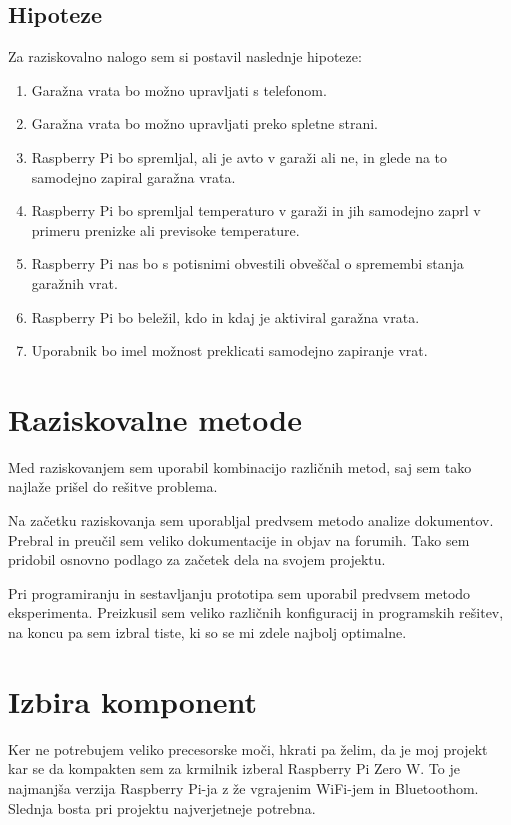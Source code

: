 \documentclass[11pt]{article}
\begin{document}
\subsection{Hipoteze}
Za raziskovalno nalogo sem si postavil naslednje hipoteze:
\begin{enumerate}
    \item Garažna vrata bo možno upravljati s telefonom.
    \item Garažna vrata bo možno upravljati preko spletne strani.
    \item Raspberry Pi bo spremljal, ali je avto v garaži ali ne, in glede na to samodejno zapiral garažna vrata.
    \item Raspberry Pi bo spremljal temperaturo v garaži in jih samodejno zaprl v primeru prenizke ali previsoke temperature.
    \item Raspberry Pi nas bo s potisnimi obvestili obveščal o spremembi stanja garažnih vrat.
    \item Raspberry Pi bo beležil, kdo in kdaj je aktiviral garažna vrata.
    \item Uporabnik bo imel možnost preklicati samodejno zapiranje vrat.
\end{enumerate}

\section{Raziskovalne metode}
Med raziskovanjem sem uporabil kombinacijo različnih metod, saj sem tako najlaže prišel do rešitve problema.

Na začetku raziskovanja sem uporabljal predvsem metodo analize dokumentov. Prebral in preučil sem veliko dokumentacije in objav na forumih. Tako sem pridobil osnovno podlago za začetek dela na svojem projektu.

Pri programiranju in sestavljanju prototipa sem uporabil predvsem metodo eksperimenta. Preizkusil sem veliko različnih konfiguracij in programskih rešitev, na koncu pa sem izbral tiste, ki so se mi zdele najbolj optimalne.
\newpage

\section{Izbira komponent}
  Ker ne potrebujem veliko precesorske moči, hkrati pa želim, da je moj projekt kar se da kompakten sem za krmilnik izberal Raspberry Pi Zero W. To je najmanjša verzija Raspberry Pi-ja z že vgrajenim WiFi-jem in Bluetoothom. Slednja bosta pri projektu najverjetneje potrebna.
\end{document}
